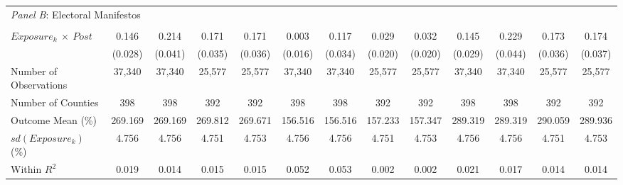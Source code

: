 \begin{tabular}{l*{1}cccccccccccc}
\\ 
\multicolumn{13}{l}{\textit{Panel B}: 
Electoral Manifestos}
\\ \\

$ Exposure_{k}\ \times \ Post $&       0.146\sym{***}&       0.214\sym{***}&       0.171\sym{***}&       0.171\sym{***}&       0.003         &       0.117\sym{***}&       0.029         &       0.032         &       0.145\sym{***}&       0.229\sym{***}&   
   0.173\sym{***}&       0.174\sym{***}\\
           &     (0.028)         &     (0.041)         &     (0.035)         &     (0.036)         &     (0.016)         &     (0.034)         &     (0.020)         &     (0.020)         &     (0.029)         &     (0.044)         &     (0.036)         &
    (0.037)         \\
Number of Observations&      37,340         &      37,340         &      25,577         &      25,577         &      37,340         &      37,340         &      25,577         &      25,577         &      37,340         &      37,340         &      25,577
        &      25,577         \\
Number of Counties&         398         &         398         &         392         &         392         &    398         &         398         &         392         &         392         &         398         &         398         &         392    
    &         392         \\
Outcome Mean (\%)&     269.169         &     269.169         &     269.812         &     269.671         &     156.516         &     156.516         &     157.233         &     157.347         &     289.319         &     289.319         &     290.059     
   &     289.936         \\
$ sd\left(Exposure_k\right) $ (\%)&       4.756         &       4.756         &       4.751         &       4.753         &       4.756         &       4.756         &       4.751         &       4.753         &       4.756         &       4.756         &
      4.751         &       4.753         \\
Within $ R^2 $&       0.019         &       0.014         &       0.015         &       0.015         &       0.052         &       0.053         &       0.002         &       0.002         &       0.021         &       0.017         &       0.014        
&       0.014         \\

\midrule


\end{tabular}
